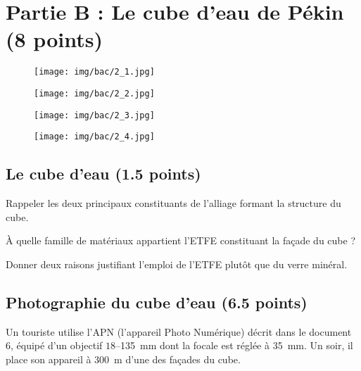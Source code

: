 \documentclass[answers]{exam}
\begin{document}
\section*{Partie B : Le cube d'eau de Pékin (8 points)}

\begin{figure}[H]
  \centering
  \texttt{[image: img/bac/2\_1.jpg]}
\end{figure}

\begin{figure}[H]
  \centering
  \texttt{[image: img/bac/2\_2.jpg]}
\end{figure}

\begin{figure}[H]
  \centering
  \texttt{[image: img/bac/2\_3.jpg]}
\end{figure}

\begin{figure}[H]
  \centering
  \texttt{[image: img/bac/2\_4.jpg]}
\end{figure}

\subsection*{Le cube d'eau (1.5 points)}

\begin{questions}
  \question[0.5] Rappeler les deux principaux constituants de l'alliage formant la structure du cube.
  
\question[0.5] À quelle famille de matériaux appartient l'ETFE constituant la façade du cube ?
  
\question[0.5] Donner deux raisons justifiant l'emploi de l'ETFE plutôt que du verre minéral.
\end{questions}


\subsection*{Photographie du cube d'eau (6.5 points)}

Un touriste utilise l'APN (l'appareil Photo Numérique) décrit dans le document 6, équipé d'un objectif $18$–\SI{135}{mm} dont la focale est réglée à \SI{35}{mm}. Un soir, il place son appareil à \SI{300}{m} d'une des façades du cube.  
\end{document}
